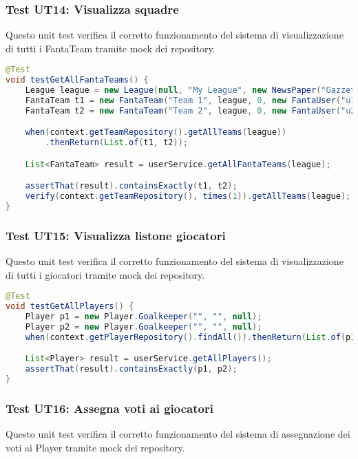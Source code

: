 \subsubsection{Test UT14: Visualizza squadre} \label{UT14}

Questo unit test verifica il corretto funzionamento del sistema di visualizzazione di tutti i FantaTeam 
tramite mock dei repository.

\begin{lstlisting}[language=Java]
@Test
void testGetAllFantaTeams() {
    League league = new League(null, "My League", new NewsPaper("Gazzetta"), "L999");
	FantaTeam t1 = new FantaTeam("Team 1", league, 0, new FantaUser("u1", "pwd"), Set.of());
	FantaTeam t2 = new FantaTeam("Team 2", league, 0, new FantaUser("u2", "pwd"), Set.of());

	when(context.getTeamRepository().getAllTeams(league))
        .thenReturn(List.of(t1, t2));

	List<FantaTeam> result = userService.getAllFantaTeams(league);

	assertThat(result).containsExactly(t1, t2);
	verify(context.getTeamRepository(), times(1)).getAllTeams(league);
}
\end{lstlisting}


\subsubsection{Test UT15: Visualizza listone giocatori} \label{UT15}

Questo unit test verifica il corretto funzionamento del sistema di visualizzazione di tutti i giocatori 
tramite mock dei repository.

\begin{lstlisting}[language=Java]
@Test
void testGetAllPlayers() {
	Player p1 = new Player.Goalkeeper("", "", null);
	Player p2 = new Player.Goalkeeper("", "", null);
	when(context.getPlayerRepository().findAll()).thenReturn(List.of(p1, p2));

	List<Player> result = userService.getAllPlayers();
	assertThat(result).containsExactly(p1, p2);
}
\end{lstlisting}


\subsubsection{Test UT16: Assegna voti ai giocatori} \label{UT16}

Questo unit test verifica il corretto funzionamento del sistema di assegnazione dei voti ai Player tramite mock dei repository.

